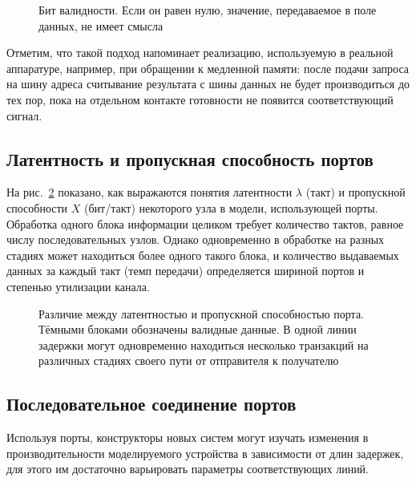 \begin{figure}[htbp]
    \centering
    \caption[Бит валидности]{Бит валидности. Если он равен нулю, значение, передаваемое в поле данных, не имеет смысла}
    \label{fig:valid}
\end{figure}

Отметим, что такой подход напоминает реализацию, используемую в реальной аппаратуре, например, при обращении к медленной памяти: после подачи запроса на шину адреса считывание результата с шины данных не будет производиться до тех пор, пока на отдельном контакте готовности не появится соответствующий сигнал.

\subsection{Латентность и пропускная способность портов}

На рис.~\ref{fig:latency-bandwidth} показано, как выражаются понятия латентности $\lambda$ (такт) и пропускной способности $X$ (бит/такт) некоторого узла в модели, использующей порты. Обработка одного блока информации целиком требует количество тактов, равное числу последовательных узлов. Однако одновременно в обработке на разных стадиях может находиться более одного такого блока, и количество выдаваемых данных за каждый такт (темп передачи)  определяется шириной портов и степенью утилизации канала.

\begin{figure}[htbp]
    \centering
    \caption[Латентность и пропускная способность порта]{Различие между латентностью и пропускной способностью порта. Тёмными блоками обозначены валидные данные. В одной линии задержки могут одновременно находиться несколько транзакций на различных стадиях своего пути от отправителя к получателю}
    \label{fig:latency-bandwidth}
\end{figure}


\subsection{Последовательное соединение портов}

Используя порты, конструкторы новых систем могут изучать изменения в производительности моделируемого устройства в зависимости от длин задержек, для этого им достаточно варьировать параметры соответствующих линий.

